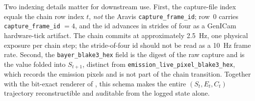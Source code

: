 Two indexing details matter for downstream use. First, the capture-file index equals the chain row index $t$, \emph{not} the Aravis \texttt{capture\_frame\_id}; row~0 carries \texttt{capture\_frame\_id} $= 4$, and the id advances in strides of four as a GenICam hardware-tick artifact. The chain commits at approximately \SI{2.5}{\hertz}, one physical exposure per chain step; the stride-of-four id should not be read as a \SI{10}{\hertz} frame rate. Second, the \texttt{bayer\_blake3\_hex} field is the digest of the raw capture and is the value folded into $S_{t+1}$, distinct from \texttt{emission\_live\_pixel\_blake3\_hex}, which records the emission pixels and is not part of the chain transition. Together with the bit-exact renderer of , this schema makes the entire $(S_t, E_t, C_t)$ trajectory reconstructible and auditable from the logged state alone.
